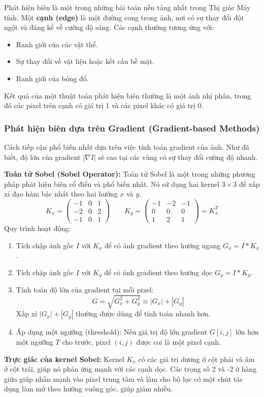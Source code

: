 Phát hiện biên là một trong những bài toán nền tảng nhất trong Thị giác Máy tính. Một \textbf{cạnh (edge)} là một đường cong trong ảnh, nơi có sự thay đổi đột ngột và đáng kể về cường độ sáng. Các cạnh thường tương ứng với:
\begin{itemize}
    \item Ranh giới của các vật thể.
    \item Sự thay đổi về vật liệu hoặc kết cấu bề mặt.
    \item Ranh giới của bóng đổ.
\end{itemize}
Kết quả của một thuật toán phát hiện biên thường là một ảnh nhị phân, trong đó các pixel trên cạnh có giá trị 1 và các pixel khác có giá trị 0.

\subsubsection{Phát hiện biên dựa trên Gradient (Gradient-based Methods)}
\label{subsubsec:gradient_based_edges}
Cách tiếp cận phổ biến nhất dựa trên việc tính toán gradient của ảnh. Như đã biết, độ lớn của gradient $|\nabla I|$ sẽ cao tại các vùng có sự thay đổi cường độ nhanh.

\textbf{Toán tử Sobel (Sobel Operator):} Toán tử Sobel là một trong những phương pháp phát hiện biên cổ điển và phổ biến nhất. Nó sử dụng hai kernel $3 \times 3$ để xấp xỉ đạo hàm bậc nhất theo hai hướng $x$ và $y$.
\begin{equation}
    K_x = \begin{pmatrix} -1 & 0 & 1 \\ -2 & 0 & 2 \\ -1 & 0 & 1 \end{pmatrix} \quad \quad K_y = \begin{pmatrix} -1 & -2 & -1 \\ 0 & 0 & 0 \\ 1 & 2 & 1 \end{pmatrix} = K_x^T
\end{equation}
Quy trình hoạt động:
\begin{enumerate}
    \item Tích chập ảnh gốc $I$ với $K_x$ để có ảnh gradient theo hướng ngang $G_x = I * K_x$.
    \item Tích chập ảnh gốc $I$ với $K_y$ để có ảnh gradient theo hướng dọc $G_y = I * K_y$.
    \item Tính toán độ lớn của gradient tại mỗi pixel:
    \begin{equation}
        G = \sqrt{G_x^2 + G_y^2} \approx |G_x| + |G_y|
    \end{equation}
    Xấp xỉ $|G_x| + |G_y|$ thường được dùng để tính toán nhanh hơn.
    \item Áp dụng một ngưỡng (threshold): Nếu giá trị độ lớn gradient $G[i, j]$ lớn hơn một ngưỡng $T$ cho trước, pixel $(i, j)$ được coi là một pixel cạnh.
\end{enumerate}
\textbf{Trực giác của kernel Sobel:} Kernel $K_x$ có các giá trị dương ở cột phải và âm ở cột trái, giúp nó phản ứng mạnh với các cạnh dọc. Các trọng số 2 và -2 ở hàng giữa giúp nhấn mạnh vào pixel trung tâm và làm cho bộ lọc có một chút tác dụng làm mờ theo hướng vuông góc, giúp giảm nhiễu.

